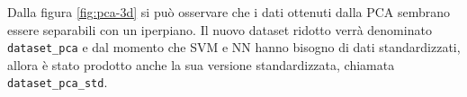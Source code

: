 Dalla figura \ref{fig:pca-3d} si può osservare che i dati ottenuti dalla PCA
sembrano essere separabili con un iperpiano. Il nuovo dataset ridotto verrà
denominato \texttt{dataset\_pca} e dal momento che SVM e NN hanno bisogno di dati
standardizzati, allora è stato prodotto anche la sua versione standardizzata,
chiamata \texttt{dataset\_pca\_std}.





